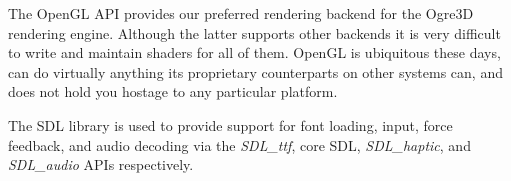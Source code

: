 
The OpenGL API provides our preferred rendering backend for the Ogre3D rendering engine. Although the latter supports other backends it is very difficult to write and maintain shaders for all of them. OpenGL is ubiquitous these days, can do virtually anything its proprietary counterparts on other systems can, and does not hold you hostage to any particular platform.


The SDL library is used to provide support for font loading, input, force feedback, and audio decoding via the {\it SDL_ttf}, core SDL, {\it SDL_haptic}, and {\it SDL_audio} APIs respectively.

\stopitemize

